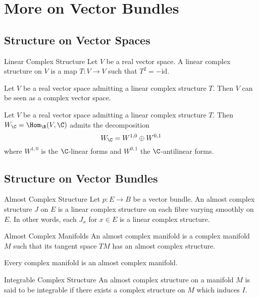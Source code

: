 \documentclass[a4paper]{article}
\begin{document}
\pagebreak
\section{More on Vector Bundles}
\subsection{Structure on Vector Spaces}
\begin{defn}{Linear Complex Structure}{} Let $V$ be a real vector space. A linear complex structure on $V$ is a map $T:V\to V$ such that $T^2=-\text{id}$. 
\end{defn}

\begin{prp}{}{} Let $V$ be a real vector space admitting a linear complex structure $T$. Then $V$ can be seen as a complex vector space. 
\end{prp}

\begin{prp}{}{} Let $V$ be a real vector space admitting a linear complex structure $T$. Then $W_\C=\Hom_\R(V,\C)$ admits the decomposition $$W_\C=W^{1,0}\oplus W^{0,1}$$ where $W^{1,0}$ is the $\C$-linear forms and $W^{0,1}$ the $\C$-antilinear forms. 
\end{prp}

\subsection{Structure on Vector Bundles}
\begin{defn}{Almost Complex Structure}{} Let $p:E\to B$ be a vector bundle. An almost complex structure $J$ on $E$ is a linear complex structure on each fibre varying smoothly on $E$. In other words, each $J_x$ for $x\in E$ is a linear complex structure. 
\end{defn}

\begin{defn}{Almost Complex Manifolds}{} An almost complex manifold is a complex manifold $M$ such that its tangent space $TM$ has an almost complex structure. 
\end{defn}

\begin{prp}{}{} Every complex manifold is an almost complex manifold. 
\end{prp}

\begin{defn}{Integrable Complex Structure}{} An almost complex structure on a manifold $M$ is said to be integrable if there exists a complex structure on $M$ which induces $I$. 
\end{defn}
\end{document}

